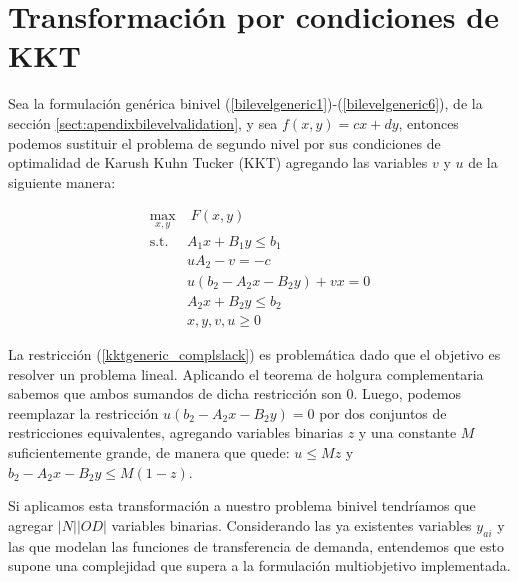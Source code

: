\section{Transformación por condiciones de KKT}
\label{sec:kkttransform}

Sea la formulación genérica binivel (\ref{bilevelgeneric1})-(\ref{bilevelgeneric6}), de la sección \ref{sect:apendixbilevelvalidation}, y sea $f(x, y) = cx + dy$, entonces podemos sustituir el problema de segundo nivel por sus condiciones de optimalidad de Karush Kuhn Tucker (KKT)\parencite{bardbook} agregando las variables $v$ y $u$ de la siguiente manera:

\begin{align}
\max_{x,y}              & \; F(x, y) \label{kktgeneric1} \\
\text{s.t.}             & A_1 x + B_1 y \leq b_1 \\
                        & uA_2 - v = -c \\
                        & u(b_2 - A_2x - B_2y) + vx = 0 \label{kktgeneric_complslack} \\
                        & A_2 x + B_2 y \leq b_2 \label{kktgeneric5} \\
                        & x, y, v, u \geq 0 \label{kktgeneric6}
\end{align}

La restricción (\ref{kktgeneric_complslack}) es problemática dado que el objetivo es resolver un problema lineal. Aplicando el teorema de holgura complementaria sabemos que ambos sumandos de dicha restricción son 0. Luego, podemos reemplazar la restricción $u(b_2 - A_2x - B_2y) = 0$ por dos conjuntos de restricciones equivalentes, agregando variables binarias $z$ y una constante $M$ suficientemente grande, de manera que quede: $u \leq Mz$ y $b_2 - A_2x - B_2y \leq M(1-z)$.

Si aplicamos esta transformación a nuestro problema binivel tendríamos que agregar $|N| |OD|$ variables binarias. Considerando las ya existentes variables $y_{ai}$ y las que modelan las funciones de transferencia de demanda, entendemos que esto supone una complejidad que supera a la formulación multiobjetivo implementada.
